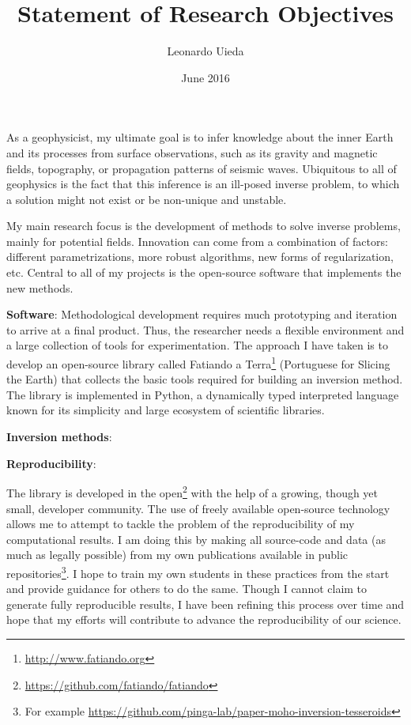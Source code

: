 \documentclass[12pt]{article}
\title{\textbf{Statement of Research Objectives}}
\author{Leonardo Uieda}
\date{June 2016}
\begin{document}
\maketitle


As a geophysicist,
my ultimate goal is
to infer knowledge about the inner Earth
and its processes
from surface observations,
such as its gravity and magnetic fields,
topography,
or propagation patterns of seismic waves.
%
Ubiquitous to all of geophysics
is the fact that this inference
is an ill-posed inverse problem,
to which a solution might not exist
or be non-unique and unstable.


My main research focus is
the development of methods
to solve inverse problems,
mainly for potential fields.
%
Innovation can come from
a combination of factors:
different parametrizations,
more robust algorithms,
new forms of regularization,
etc.
%
Central to all of my projects
is the open-source software
that implements the new methods.


\textbf{Software}:
Methodological development requires
much prototyping and iteration
to arrive at a final product.
%
Thus,
the researcher needs
a flexible environment
and a large collection of tools
for experimentation.
%
The approach I have taken is
to develop an open-source library
called Fatiando a Terra\footnote{\url{http://www.fatiando.org}}
(Portuguese for Slicing the Earth)
that collects the basic tools
required for building an inversion method.
%
The library is implemented in Python,
a dynamically typed interpreted language
known for its simplicity
and large ecosystem of scientific libraries.



\textbf{Inversion methods}:




\textbf{Reproducibility}:



%
The library is developed in the
open\footnote{\url{https://github.com/fatiando/fatiando}}
with the help of a growing, though yet small,
developer community.
%
The use of freely available open-source technology
allows me to attempt to tackle
the problem of the reproducibility of my computational results.
%
I am doing this by
making all source-code and data (as much as legally possible)
from my own publications
available in public
repositories\footnote{For example
\url{https://github.com/pinga-lab/paper-moho-inversion-tesseroids}}.
%
I hope to train my own students
in these practices from the start
and provide guidance for others to do the same.
%
Though I cannot claim
to generate fully reproducible results,
I have been refining this process over time
and hope that my efforts will contribute
to advance the reproducibility of our science.
\end{document}
